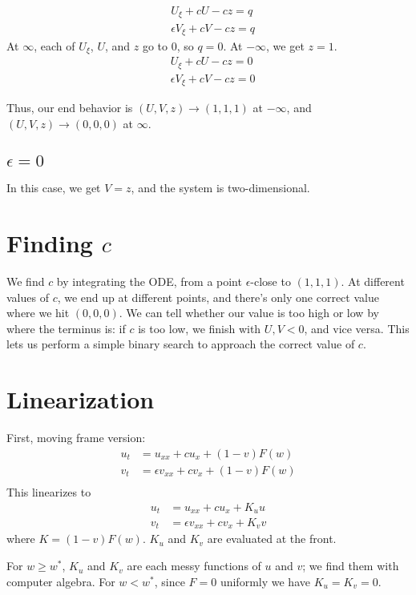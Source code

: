 \documentclass[10pt]{article}
\begin{document}
\begin{align}
&U_\xi + cU - cz = q \\
&\epsilon V_\xi + cV - cz = q
\end{align}
At $\infty$, each of $U_\xi$, $U$, and $z$ go to 0, so $q=0$.
At $-\infty$, we get $z=1$.
\begin{align}
&U_\xi + cU - cz = 0 \\
&\epsilon V_\xi + cV - cz = 0
\end{align}

Thus, our end behavior is $(U,V,z) \to (1,1,1)$ at $-\infty$, and $(U,V,z) \to (0,0,0)$ at $\infty$.

\subsection{$\epsilon = 0$}
In this case, we get $V = z$, and the system is two-dimensional.


\section{Finding $c$}
We find $c$ by integrating the ODE, from a point $\epsilon$-close to $(1,1,1)$.
At different values of $c$, we end up at different points, and there's only one correct value where we hit $(0,0,0)$.
We can tell whether our value is too high or low by where the terminus is: if $c$ is too low, we finish with $U,V < 0$, and vice versa.  This lets us perform a simple binary search to approach the correct value of $c$.


\section{Linearization}
First, moving frame version:
\begin{align}
u_t &= u_{xx} + c u_x + (1-v)F(w) \\
v_t &= \epsilon v_{xx} + c v_x+ (1-v)F(w)\\
\end{align}
This linearizes to
\begin{align}
u_t &= u_{xx} + c u_x + K_u u \\
v_t &= \epsilon v_{xx} + c v_x+ K_v v
\end{align}
where $K = (1-v)F(w)$.
$K_u$ and $K_v$ are evaluated at the front.

For $w \geq w^*$, $K_u$ and $K_v$ are each messy functions of $u$ and $v$; we find them with computer algebra.
For $w < w^*$, since $F = 0$ uniformly we have $K_u = K_v = 0$.
\end{document}

